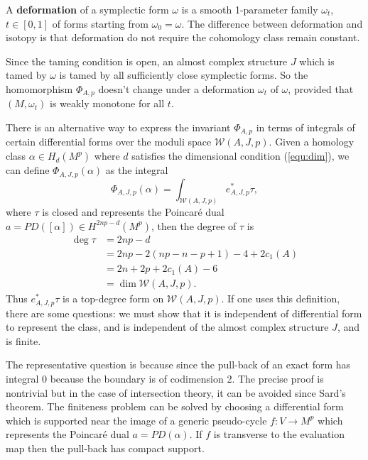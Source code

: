 \documentclass[twoside]{article}
\begin{document}
A \textbf{deformation} of a symplectic form $\omega$ is 
a smooth 1-parameter family $\omega_t$,  $t\in[0,1]$ of forms starting from $\omega_0=\omega$. 
The difference between deformation and isotopy is that 
deformation do not require the cohomology class remain constant.

Since the taming condition is open, an almost complex structure $J$ 
which is tamed by $\omega$ is tamed by all sufficiently close symplectic forms. 
So the homomorphism $\Phi_{A,p}$ doesn't change under a deformation $\omega_t$ of $\omega$, 
provided that $(M,\omega_t)$ is weakly monotone for all $t$.

\begin{remark}
    There is an alternative way to express the invariant $\Phi_{A,p}$ in terms of 
    integrals of certain differential forms over the moduli space $\mathscr{W}(A,J,p)$. 
    Given a homology class $\alpha\in H_d(M^p)$ where $d$ satisfies the dimensional condition (\ref{equ:dim}), 
    we can define $\Phi_{A,J,p}(\alpha)$ as the integral
    \[\Phi_{A,J,p}(\alpha)=\int_{\mathscr{W}(A,J,p)}e_{A,J,p}^*\tau,\]
    where $\tau$ is closed and represents the Poincar\'e dual $a=\mathit{PD}([\alpha])\in H^{2np-d}(M^p)$, 
    then the degree of $\tau$ is
    \[ \begin{aligned}
        \deg \tau &=2np-d \\
        &=2np-2(np-n-p+1)-4+2c_1(A)\\
        &=2n+2p+2c_1(A)-6 \\
        &=\dim\mathscr{W}(A,J,p).
    \end{aligned} \]
    Thus $e_{A,J,p}^*\tau$ is a top-degree form on $\mathscr{W}(A,J,p)$. 
    If one uses this definition, there are some questions: 
    we must show that it is independent of differential form to represent the class, 
    and is independent of the almost complex structure $J$, and is finite.

    The representative question is because since 
    the pull-back of an exact form has integral 0 because the boundary is of codimension 2.
    The precise proof is nontrivial but in the case of intersection theory, 
    it can be avoided since Sard's theorem. 
    The finiteness problem can be solved by choosing a differential form 
    which is supported near the image of a generic pseudo-cycle $f\colon V\rightarrow M^p$ 
    which represents the Poincar\'e dual $a=\mathit{PD}(\alpha)$. 
    If $f$ is transverse to the evaluation map then the pull-back has compact support.
\end{remark}
\end{document}
